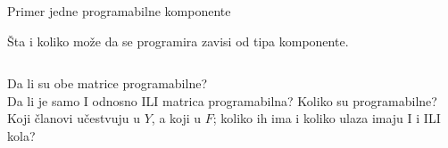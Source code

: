 \begin{frame}[label=07-s005]{Primer jedne programabilne komponente}
\centering\par
\vspace{2mm}\raggedright\fontsize{10}{12}\selectfont
Šta i koliko može da se programira zavisi od tipa komponente.
\begin{columns}[T,onlytextwidth]
Da li su obe matrice programabilne?\\[2mm]
Da li je samo I odnosno ILI matrica programabilna?
Koliko su programabilne?\\[2mm]
Koji članovi učestvuju u $Y$, a koji u $F$; koliko ih ima i koliko ulaza imaju I i ILI kola?
\end{columns}
\end{frame}

